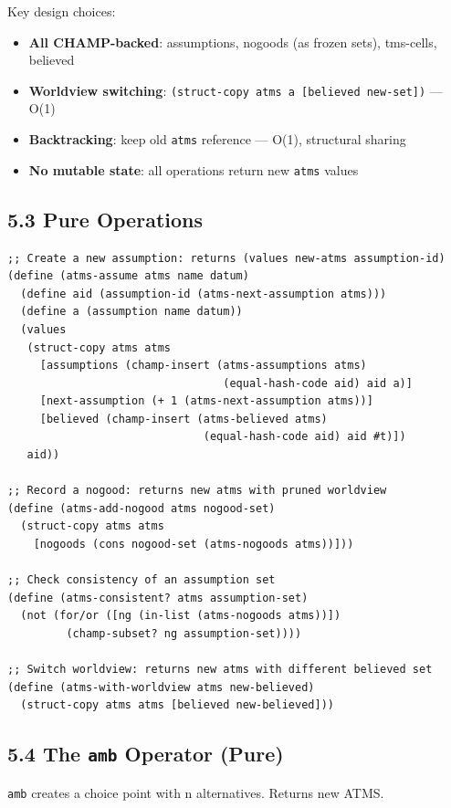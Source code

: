 \documentclass[11pt]{article}
\begin{document}
Key design choices:
\begin{itemize}
\item \textbf{All CHAMP-backed}: assumptions, nogoods (as frozen sets), tms-cells, believed
\item \textbf{Worldview switching}: \texttt{(struct-copy atms a [believed new-set])} — O(1)
\item \textbf{Backtracking}: keep old \texttt{atms} reference — O(1), structural sharing
\item \textbf{No mutable state}: all operations return new \texttt{atms} values
\end{itemize}
\subsection{5.3 Pure Operations}
\label{sec:org99a9f07}

\begin{verbatim}
;; Create a new assumption: returns (values new-atms assumption-id)
(define (atms-assume atms name datum)
  (define aid (assumption-id (atms-next-assumption atms)))
  (define a (assumption name datum))
  (values
   (struct-copy atms atms
     [assumptions (champ-insert (atms-assumptions atms)
                                 (equal-hash-code aid) aid a)]
     [next-assumption (+ 1 (atms-next-assumption atms))]
     [believed (champ-insert (atms-believed atms)
                              (equal-hash-code aid) aid #t)])
   aid))

;; Record a nogood: returns new atms with pruned worldview
(define (atms-add-nogood atms nogood-set)
  (struct-copy atms atms
    [nogoods (cons nogood-set (atms-nogoods atms))]))

;; Check consistency of an assumption set
(define (atms-consistent? atms assumption-set)
  (not (for/or ([ng (in-list (atms-nogoods atms))])
         (champ-subset? ng assumption-set))))

;; Switch worldview: returns new atms with different believed set
(define (atms-with-worldview atms new-believed)
  (struct-copy atms atms [believed new-believed]))
\end{verbatim}
\subsection{5.4 The \texttt{amb} Operator (Pure)}
\label{sec:orgcd0da0b}

\texttt{amb} creates a choice point with n alternatives. Returns new ATMS.
\end{document}
